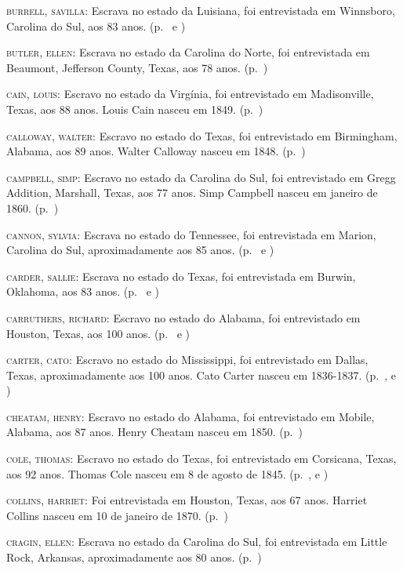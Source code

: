 \begin{Parskip}
\textsc{burrell, savilla:} Escrava no estado da Luisiana, foi
entrevistada em Winnsboro, Carolina do Sul, aos 83 anos. (p.~\pageref{ref39} e \pageref{ref40})

\textsc{butler, ellen:} Escrava no estado da Carolina do Norte, foi
entrevistada em Beaumont, Jefferson County, Texas, aos 78 anos. (p.~\pageref{ref41})

\textsc{cain, louis:} Escravo no estado da Virgínia, foi entrevistado em
Madisonville, Texas, aos 88 anos. Louis Cain nasceu em 1849. (p.~\pageref{ref42})

\textsc{calloway, walter:} Escravo no estado do Texas, foi entrevistado
em Birmingham, Alabama, aos 89 anos. Walter Calloway nasceu em 1848. (p.~\pageref{ref43})

\textsc{campbell, simp:} Escravo no estado da Carolina do Sul, foi
entrevistado em Gregg Addition, Marshall, Texas, aos 77 anos. Simp
Campbell nasceu em janeiro de 1860. (p.~\pageref{ref44})

\textsc{cannon, sylvia:} Escrava no estado do Tennessee, foi
entrevistada em Marion, Carolina do Sul, aproximadamente aos 85 anos. (p.~\pageref{ref45} e \pageref{ref46})

\textsc{carder, sallie:} Escrava no estado do Texas, foi entrevistada em
Burwin, Oklahoma, aos 83 anos. (p.~\pageref{ref47} e \pageref{ref48}) 

\textsc{carruthers, richard:} Escravo no estado do Alabama, foi
entrevistado em Houston, Texas, aos 100 anos. (p.~\pageref{ref49} e \pageref{ref50}) 

\textsc{carter, cato:} Escravo no estado do Mississippi, foi
entrevistado em Dallas, Texas, aproximadamente aos 100 anos. Cato Carter
nasceu em 1836-1837. (p.~\pageref{ref51}, \pageref{ref52} e \pageref{ref53}) 

\textsc{cheatam, henry:} Escravo no estado do Alabama, foi entrevistado
em Mobile, Alabama, aos 87 anos. Henry Cheatam nasceu em 1850. (p.~\pageref{ref54})

\textsc{cole, thomas:} Escravo no estado do Texas, foi entrevistado em
Corsicana, Texas, aos 92 anos. Thomas Cole nasceu em 8 de agosto de
1845. (p.~\pageref{ref55}, \pageref{ref56} e \pageref{ref57})

\textsc{collins, harriet:} Foi entrevistada em Houston, Texas, aos 67
anos. Harriet Collins nasceu em 10 de janeiro de 1870. (p.~\pageref{ref58})

\textsc{cragin, ellen:} Escrava no estado da Carolina do Sul, foi
entrevistada em Little Rock, Arkansas, aproximadamente aos 80 anos. (p.~\pageref{ref59})


\end{Parskip}
